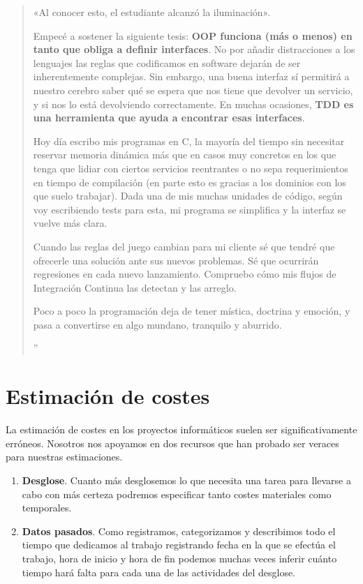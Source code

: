 \begin{quote}
{    «Al conocer esto, el estudiante alcanzó la iluminación». \cite{koans}

    Empecé a sostener la siguiente tesis: \textbf{OOP funciona (más o menos) en tanto
    que obliga a definir interfaces}. No por añadir distracciones a los lenguajes las
    reglas que codificamos en software dejarán de ser inherentemente complejas.
    Sin embargo, una buena interfaz sí permitirá a nuestro cerebro saber qué se espera
    que nos tiene que devolver un servicio, y si nos lo está devolviendo correctamente.
    En muchas ocasiones, \textbf{TDD es una herramienta que ayuda a encontrar esas
    interfaces}.

    Hoy día escribo mis programas en C, la mayoría del tiempo sin necesitar reservar
    memoria dinámica más que en casos muy concretos en los que tenga que lidiar con
    ciertos servicios reentrantes o no sepa requerimientos en tiempo de compilación
    (en parte esto es gracias a los dominios con los que suelo trabajar). Dada una
    de mis muchas unidades de código, según voy escribiendo tests para esta, mi
    programa se simplifica y la interfaz se vuelve más clara.

    Cuando las reglas del juego cambian para mi cliente sé que tendré que ofrecerle
    una solución ante sus nuevos problemas. Sé que ocurrirán regresiones en cada nuevo
    lanzamiento. Compruebo cómo mis flujos de Integración Continua las detectan y las arreglo.

    Poco a poco la programación deja de tener mística, doctrina y emoción, y pasa a
    convertirse en algo mundano, tranquilo y aburrido.%
}''
\end{quote}

\section{Estimación de costes}

La estimación de costes en los proyectos informáticos suelen
ser significativamente erróneos. Nosotros nos apoyamos en dos
recursos que han probado ser veraces para nuestras estimaciones.

\begin{enumerate}
    \item \textbf{Desglose}. Cuanto más desglosemos lo que
          necesita una tarea para llevarse a cabo con más
          certeza podremos especificar tanto costes materiales
          como temporales.
    \item \textbf{Datos pasados}. Como registramos, categorizamos
          y describimos todo el tiempo que dedicamos al trabajo
          registrando fecha en la que se efectúa el trabajo, hora
          de inicio y hora de fin podemos muchas veces inferir
          cuánto tiempo hará falta para cada una de las actividades
          del desglose.
\end{enumerate}

